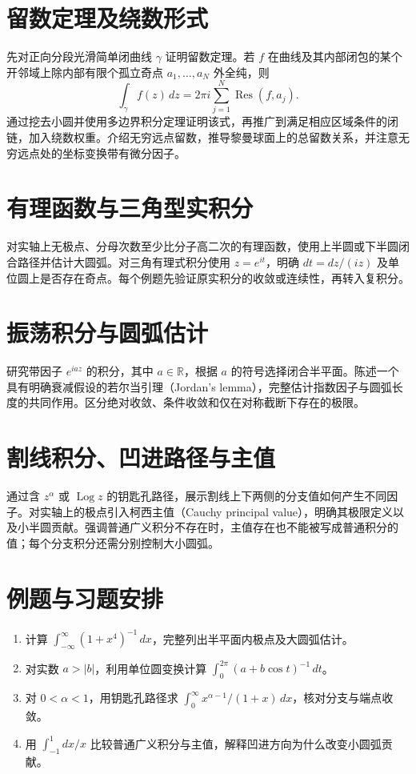 \documentclass[UTF8,12pt,a4paper,fontset=fandol]{ctexbook}
\begin{document}
\section{留数定理及绕数形式}
先对正向分段光滑简单闭曲线 $\gamma$ 证明留数定理。若 $f$ 在曲线及其内部闭包的某个开邻域上除内部有限个孤立奇点 $a_1,\ldots,a_N$ 外全纯，则
\begin{equation}
  \int_\gamma f(z)\,dz=2\pi i\sum_{j=1}^{N}\operatorname{Res}(f,a_j).
  \label{eq:ca-residue-theorem}
\end{equation}
通过挖去小圆并使用多边界积分定理证明该式，再推广到满足相应区域条件的闭链，加入绕数权重。介绍无穷远点留数，推导黎曼球面上的总留数关系，并注意无穷远点处的坐标变换带有微分因子。

\section{有理函数与三角型实积分}
对实轴上无极点、分母次数至少比分子高二次的有理函数，使用上半圆或下半圆闭合路径并估计大圆弧。对三角有理式积分使用 $z=e^{it}$，明确 $dt=dz/(iz)$ 及单位圆上是否存在奇点。每个例题先验证原实积分的收敛或连续性，再转入复积分。

\section{振荡积分与圆弧估计}
研究带因子 $e^{iaz}$ 的积分，其中 $a\in\mathbb{R}$，根据 $a$ 的符号选择闭合半平面。陈述一个具有明确衰减假设的若尔当引理（Jordan's lemma），完整估计指数因子与圆弧长度的共同作用。区分绝对收敛、条件收敛和仅在对称截断下存在的极限。

\section{割线积分、凹进路径与主值}
通过含 $z^\alpha$ 或 $\operatorname{Log}z$ 的钥匙孔路径，展示割线上下两侧的分支值如何产生不同因子。对实轴上的极点引入柯西主值（Cauchy principal value），明确其极限定义以及小半圆贡献。强调普通广义积分不存在时，主值存在也不能被写成普通积分的值；每个分支积分还需分别控制大小圆弧。

\section{例题与习题安排}
\begin{enumerate}
  \item 计算 $\int_{-\infty}^{\infty}(1+x^4)^{-1}\,dx$，完整列出半平面内极点及大圆弧估计。
  \item 对实数 $a>|b|$，利用单位圆变换计算 $\int_0^{2\pi}(a+b\cos t)^{-1}\,dt$。
  \item 对 $0<\alpha<1$，用钥匙孔路径求 $\int_0^{\infty}x^{\alpha-1}/(1+x)\,dx$，核对分支与端点收敛。
  \item 用 $\int_{-1}^{1}dx/x$ 比较普通广义积分与主值，解释凹进方向为什么改变小圆弧贡献。
\end{enumerate}
\end{document}
